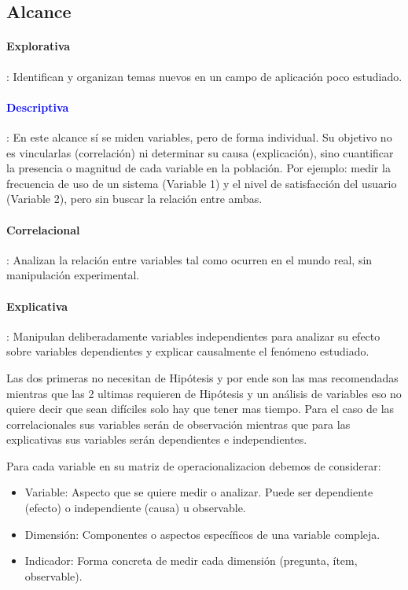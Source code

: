 \subsection{Alcance}
\paragraph{Explorativa}: Identifican y organizan temas nuevos en un campo de aplicación poco estudiado. 
\paragraph{\textcolor{blue}{Descriptiva}}: En este alcance sí se miden variables, pero de forma individual. Su objetivo no es vincularlas (correlación) ni determinar su causa (explicación), sino cuantificar la presencia o magnitud de cada variable en la población. Por ejemplo: medir la frecuencia de uso de un sistema (Variable 1) y el nivel de satisfacción del usuario (Variable 2), pero sin buscar la relación entre ambas.
\paragraph{Correlacional}: Analizan la relación entre variables tal como ocurren en el mundo real, sin manipulación experimental.
\paragraph{Explicativa}: Manipulan deliberadamente variables independientes para analizar su efecto sobre variables dependientes y explicar causalmente el fenómeno estudiado.

Las dos primeras no necesitan de Hipótesis y por ende son las mas recomendadas mientras que las 2 ultimas requieren de Hipótesis y un análisis de variables eso no quiere decir que sean difíciles solo hay que tener mas tiempo.
Para el caso de las correlacionales sus variables serán de observación mientras que para las explicativas sus variables serán dependientes e independientes.

Para cada variable en su matriz de operacionalizacion debemos de considerar: 
\begin{itemize}
    \item Variable: Aspecto que se quiere medir o analizar. Puede ser dependiente (efecto) o independiente (causa) u observable.
    \item Dimensión: Componentes o aspectos específicos de una variable compleja.
    \item Indicador: Forma concreta de medir cada dimensión (pregunta, ítem, observable).
\end{itemize}

